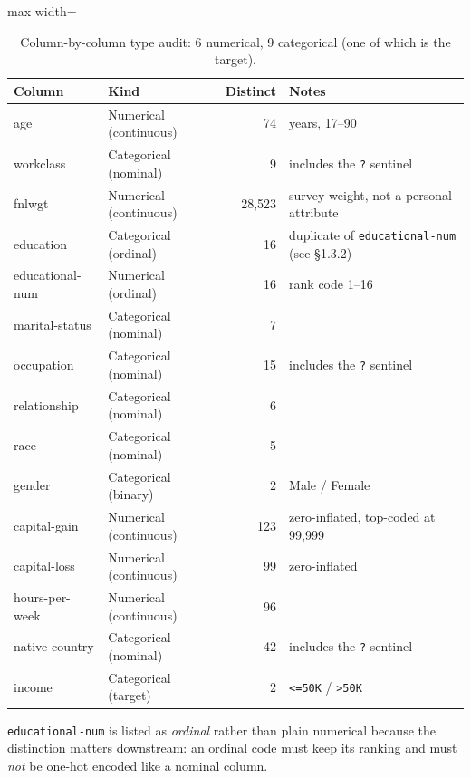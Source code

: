 \documentclass[11pt,a4paper]{article}
\newcommand{\code}[1]{\texttt{\small #1}}
\begin{document}
\begin{table}[H]
\centering
\caption{Column-by-column type audit: 6 numerical, 9 categorical (one of which is the target).}
\small
\begin{adjustbox}{max width=\linewidth}
\begin{tabular}{llrl}
\toprule
\textbf{Column} & \textbf{Kind} & \textbf{Distinct} & \textbf{Notes} \\
\midrule
age             & Numerical (continuous)  & 74 & years, 17--90 \\
workclass       & Categorical (nominal)   & 9  & includes the \code{?} sentinel \\
fnlwgt          & Numerical (continuous)  & 28{,}523 & survey weight, not a personal attribute \\
education       & Categorical (ordinal)   & 16 & duplicate of \code{educational-num} (see \S1.3.2) \\
educational-num & Numerical (ordinal)     & 16 & rank code 1--16 \\
marital-status  & Categorical (nominal)   & 7  & \\
occupation      & Categorical (nominal)   & 15 & includes the \code{?} sentinel \\
relationship    & Categorical (nominal)   & 6  & \\
race            & Categorical (nominal)   & 5  & \\
gender          & Categorical (binary)    & 2  & Male / Female \\
capital-gain    & Numerical (continuous)  & 123 & zero-inflated, top-coded at 99{,}999 \\
capital-loss    & Numerical (continuous)  & 99 & zero-inflated \\
hours-per-week  & Numerical (continuous)  & 96 & \\
native-country  & Categorical (nominal)   & 42 & includes the \code{?} sentinel \\
income          & Categorical (target)    & 2  & \code{<=50K} / \code{>50K} \\
\bottomrule
\end{tabular}
\end{adjustbox}
\end{table}

\noindent
\code{educational-num} is listed as \emph{ordinal} rather than plain numerical because the
distinction matters downstream: an ordinal code must keep its ranking and must \emph{not}
be one-hot encoded like a nominal column.
\end{document}
